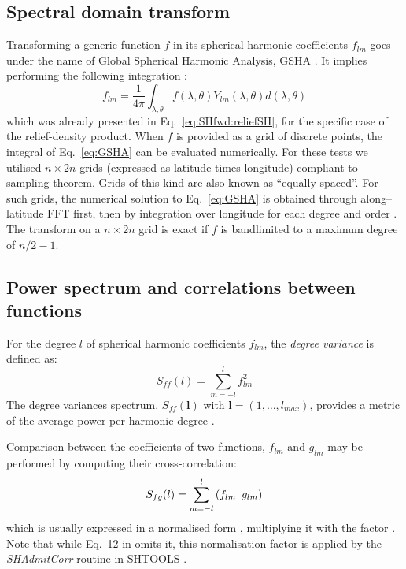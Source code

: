 \subsection{Spectral domain transform}
\label{ss:SigIs:Fwd:SHtransform}

Transforming a generic function $f$ in its spherical harmonic coefficients $f_{lm}$ goes under the name of Global Spherical Harmonic Analysis, GSHA \parencite{Sneeuw1994}.
It implies performing the following integration \parencite[Eq.~8 in][]{Wieczorek2007}:
\begin{equation}
    \label{eq:GSHA}
    f_{lm} =
    \frac{1}{4 \pi}
    \int_{\lambda, \theta}
    f(\lambda, \theta)
    Y_{lm}(\lambda, \theta) d(\lambda, \theta)
\end{equation}
which was already presented in Eq.~\ref{eq:SHfwd:reliefSH}, for the specific case of the relief-density product.
When $f$ is provided as a grid of discrete points, the integral of Eq.~\ref{eq:GSHA} can be evaluated numerically.
For these tests we utilised $n \times 2n$ grids (expressed as latitude times longitude) compliant to \textcite{Driscoll1994} sampling theorem.
Grids of this kind are also known as ``equally spaced''.
For such grids, the numerical solution to Eq.~\ref{eq:GSHA} is obtained through along--latitude FFT first, then by integration over longitude for each degree and order \parencites{Sneeuw1994}{Wieczorek2007}.
The transform on a $n \times 2n$ \textcite{Driscoll1994} grid is exact if $f$ is bandlimited to a maximum degree of $n/2 - 1$.

\subsection{Power spectrum and correlations between functions}
\label{ss:SigIs:Fwd:Spectrum}

For the degree $l$ of spherical harmonic coefficients $f_{lm}$, the \textit{degree variance} is defined as:
\begin{equation}
    \label{eq:DegVar}
    S_{ff}(l) = \sum_{m=-l}^{l} f_{lm}^2
\end{equation}
The degree variances spectrum, $S_{ff}(\bm{l})$ with $\bm{l} = (1, \dots, l_{max})$, provides a metric of the average power per harmonic degree \parencites{Rapp1982}{Wieczorek2007}{Hirt2015}.

Comparison between the coefficients of two functions, $f_{lm}$ and $g_{lm}$ may be performed by computing their cross-correlation:
\begin{equation}
    \label{eq:DegVarCross}
    S_{fg}(l) = \sum_{m=-l}^{l} \left( f_{lm} \enskip g_{lm} \right)
\end{equation}
which is usually expressed in a normalised form \parencites[e.g.][]{Phillips1980}{Rapp1982}{Rexer2016}, multiplying it with the factor .
Note that while Eq.~12 in \textcite{Wieczorek2007} omits it, this normalisation factor is applied by the \textit{SHAdmitCorr} routine in {SHTOOLS} \parencite{Wieczorek2018}.

